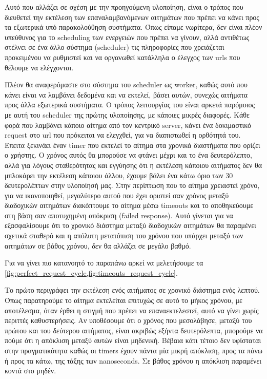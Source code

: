 Αυτό που αλλάζει σε σχέση με την προηγούμενη υλοποίηση, είναι ο τρόπος που διευθετεί
την εκτέλεση των επαναλαμβανόμενων αιτημάτων που πρέπει να κάνει προς τα εξωτερικά υπό παρακολούθηση συστήματα.
Όπως είπαμε νωρίτερα, δεν είναι πλέον υπεύθυνος για το scheduling των ενεργειών που πρέπει να γίνουν,
αλλά αντιθέτως στέλνει σε ένα άλλο σύστημα (scheduler) τις πληροφορίες που χρειάζεται προκειμένου να ρυθμιστεί και να οργανωθεί κατάλληλα
ο έλεγχος των urls που θέλουμε να ελέγχονται.

Πλέον θα αναφερόμαστε στο σύστημα του scheduler ως worker, καθώς αυτό που κάνει είναι να λαμβάνει δεδομένα και να
εκτελεί, βάσει αυτών, συνεχώς αιτήματα προς άλλα εξωτερικά συστήματα. Ο τρόπος λειτουργίας του είναι αρκετά παρόμοιος
με αυτή του scheduler της πρώτης υλοποίησης, με κάποιες μικρές διαφορές. Κάθε φορά που λαμβάνει κάποιο αίτημα από τον κεντρικό server, κάνει ένα δοκιμαστικό request
στο url που πρόκειται να ελεγχθεί, για να διαπιστωθεί η ορθότητά του. Έπειτα ξεκινάει έναν timer που εκτελεί το αίτημα στα χρονικά διαστήματα που ορίζει ο χρήστης. Ο χρόνος αυτός θα μπορούσε να φτάνει μέχρι και το ένα δευτερόλεπτο, αλλά για λόγους σταθερότητας και
εγγύησης ότι η εκτέλεση κάποιου αιτήματος δεν θα μπλοκάρει την εκτέλεση κάποιου άλλου, έχουμε βάλει ένα κάτω όριο των 30 δευτερολέπτων στην υλοποίησή μας.
Στην περίπτωση που το αίτημα χρειαστεί χρόνο, για να ικανοποιηθεί, μεγαλύτερο αυτού που έχει οριστεί σαν χρόνος μεταξύ
διαδοχικών αιτημάτων διακόπτουμε το αίτημα μέσω timeouts και το αποθηκεύουμε στη βάση σαν αποτυχημένη απόκριση (failed response).
Αυτό γίνεται για να εξασφαλίσουμε ότι το χρονικό διάστημα μεταξύ διαδοχικών αιτημάτων θα παραμένει
σχετικά σταθερό και η απόλυτη μετατόπιση του χρόνου που υπάρχει μεταξύ των αιτημάτων σε βάθος χρόνου,
δεν θα αλλάζει σε μεγάλο βαθμό.

Για να γίνει πιο κατανοητό το παραπάνω αρκεί να μελετήσουμε τα \cref{fig:perfect_request_cycle,fig:timeouts_request_cycle}.

Το πρώτο περιγράφει την εκτέλεση ενός αιτήματος σε χρονικό διάστημα ενός λεπτού. Όπως παρατηρούμε το
αίτημα εκτελείται επιτυχώς σε αυτό το μήκος χρόνου, με αποτέλεσμα, όταν έρθει η στιγμή που πρέπει να επαναεκτελεστεί,
αυτό να γίνει χωρίς περιττές καθυστερήσεις. Αν υποθέσουμε ότι ο χρόνος που μεσολάβησε, μεταξύ του πρώτου και του δεύτερου αιτήματος,
είναι ακριβώς εξήντα δευτερόλεπτα, μπορούμε να πούμε ότι η απόκλιση μεταξύ αυτών είναι μηδενική.
Βέβαια κάτι τέτοιο δεν υφίσταται στην πραγματικότητα καθώς οι timers έχουν πάντα μία μικρή απόκλιση, προς τα πάνω ή προς τα κάτω, της τάξης των nanoseconds.
Σε βάθος χρόνου η απόκλιση παραμένει κοντά στο μηδέν.

